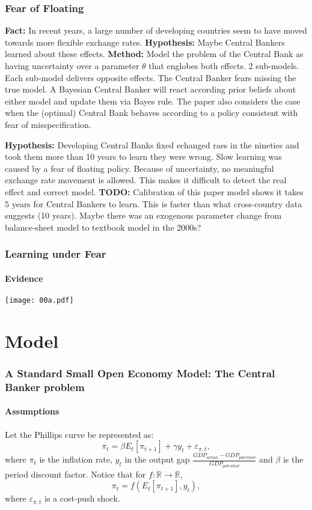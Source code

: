 \documentclass{beamer}
\begin{document}
\begin{frame} 
\frametitle{Fear of Floating} 
\textbf{Fact:} In recent years, a large number of developing countries
seem to have moved towards more flexible exchange rates.
\newline
\newline 
\textbf{Hypothesis:}  Maybe Central Bankers learned about these effects.
\newline
\newline
\textbf{Method:} Model the problem of the Central Bank as having uncertainty
over a parameter $\theta$ that englobes both effects. 2 sub-models. Each sub-model delivers opposite effects.
The Central Banker fears missing the true model. A Bayesian Central Banker
will react according prior beliefs about either model and
update them via Bayes rule. The paper also considers the case when
the (optimal) Central Bank behaves according to a policy consistent
with fear of misspecification.  
\end{frame}

\begin{frame} 
\textbf{Hypothesis:} Developing Central Banks fixed echanged raes in the
nineties and took them more than 10 years to learn they were wrong.
Slow learning was caused by a fear of floating policy. Because of uncertainty,
no meaningful exchange rate movement is allowed. This makes it difficult to
detect the real effect and correct model. 
\newline
\newline
\textbf{TODO:} Calibration of this paper model shows it takes 5 years for
Central Bankers to learn. This is faster than what cross-country data suggests (10
years). Maybe there was an exogenous parameter change from balance-sheet model
to textbook model in the 2000s?
\end{frame}


\begin{frame} 
\frametitle{Learning under Fear} 
\framesubtitle{Evidence} 
\texttt{[image: 00a.pdf]}
\end{frame}

\section{Model}
\begin{frame} 
\frametitle{A Standard Small Open Economy Model: The Central Banker problem} 
\framesubtitle{Assumptions} 
Let the Phillips curve be represented as:
\begin{equation}
\pi_t = \beta E_t [\pi_{t+1}] + \gamma y_t + \varepsilon_{\pi,t},
\end{equation}
where $\pi_t$ is the inflation rate, $y_t$ in the output gap $\frac{GDP_{actual}-GDP_{potential}}{GDP_{potential}}$
and  $\beta$ is the period discount factor. Notice that for $f: \mathbb{R} \rightarrow
\mathbb{R}$,
\begin{equation}
\pi_t = f(E_t[\pi_{t+1}], y_t),
\end{equation}
where  $\varepsilon_{\pi,t}$ is a cost-push shock.
\end{frame}
\end{document}
